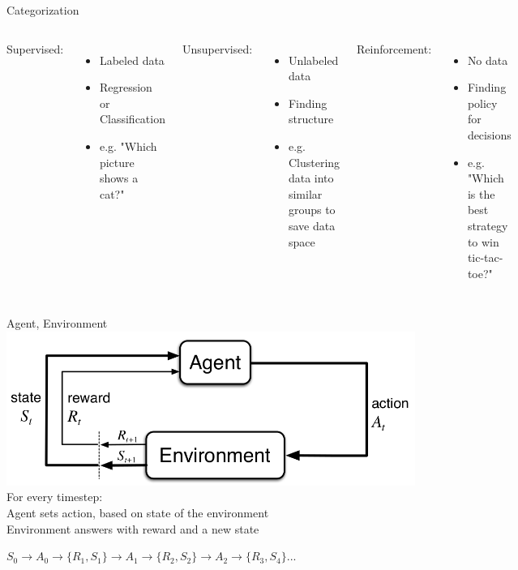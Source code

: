 \documentclass{beamer}
\begin{document}
\begin{frame}{Categorization}
	\begin{columns}[T, onlytextwidth] %
			Supervised:
			\begin{itemize}
				\item Labeled data
				\item Regression or Classification
				\item e.g. "Which picture shows a cat?"
			\end{itemize}
		
			Unsupervised:
			\begin{itemize}
				\item Unlabeled data
				\item Finding structure
				\item e.g. Clustering data into similar groups to save data space
			\end{itemize}
		
			Reinforcement:
			\begin{itemize}
				\item No data
				\item Finding policy for decisions
				\item e.g. "Which is the best strategy to win tic-tac-toe?"
			\end{itemize}
	\end{columns}
\end{frame}


\begin{frame}{Agent, Environment}
	\includegraphics[width=0.9\linewidth]{Images/AgentEnvironment.png} \\

	For every timestep: \\
		\hspace{1cm} Agent sets action, based on state of the environment \\
		\hspace{1cm} Environment answers with reward and a new state 

	$S_0 \rightarrow A_0 \rightarrow \{ R_{1}, S_1 \} \rightarrow A_1 \rightarrow \{ R_{2}, S_2 \} \rightarrow A_2 \rightarrow \{ R_{3}, S_{4} \} ...$

\end{frame}
\end{document}
